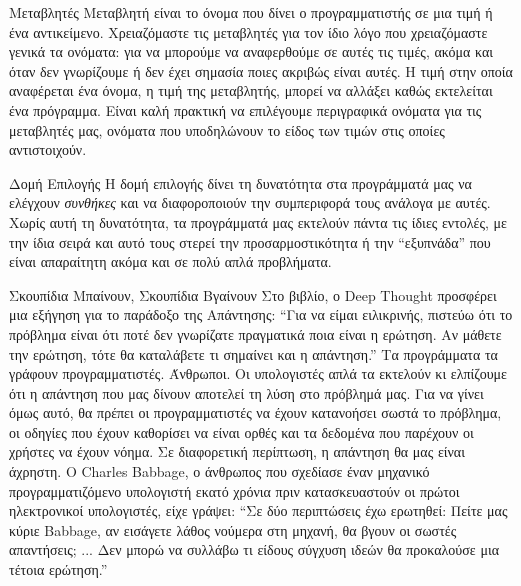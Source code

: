 \documentclass[a4paper,11pt,oneside]{book}
\begin{document}
\begin{theory}{Μεταβλητές}
Μεταβλητή είναι το όνομα που δίνει ο προγραμματιστής σε μια τιμή ή ένα αντικείμενο. Χρειαζόμαστε τις μεταβλητές για τον ίδιο λόγο που χρειαζόμαστε γενικά τα ονόματα: για να μπορούμε να αναφερθούμε σε αυτές τις τιμές, ακόμα και όταν δεν γνωρίζουμε ή δεν έχει σημασία ποιες ακριβώς είναι αυτές.
Η τιμή στην οποία αναφέρεται ένα όνομα, η τιμή της μεταβλητής, μπορεί να αλλάξει καθώς εκτελείται ένα πρόγραμμα. Είναι καλή πρακτική να επιλέγουμε περιγραφικά ονόματα για τις μεταβλητές μας, ονόματα που υποδηλώνουν το είδος των τιμών στις οποίες αντιστοιχούν. 
\end{theory}

\begin{theory}{Δομή Επιλογής}
Η δομή επιλογής δίνει τη δυνατότητα στα προγράμματά μας να ελέγχουν \emph{συνθήκες} και να διαφοροποιούν την συμπεριφορά τους ανάλογα με αυτές. Χωρίς αυτή τη δυνατότητα, τα προγράμματά μας εκτελούν πάντα τις ίδιες εντολές, με την ίδια σειρά και αυτό τους στερεί την προσαρμοστικότητα ή την ``εξυπνάδα'' που είναι απαραίτητη ακόμα και σε πολύ απλά προβλήματα.
\end{theory}

\begin{theory}{Σκουπίδια Μπαίνουν, Σκουπίδια Βγαίνουν}
Στο βιβλίο, ο Deep Thought προσφέρει μια εξήγηση για το παράδοξο της Απάντησης: ``Για να είμαι ειλικρινής, πιστεύω ότι το πρόβλημα είναι ότι ποτέ δεν γνωρίζατε πραγματικά ποια είναι η ερώτηση. Αν μάθετε την ερώτηση, τότε θα καταλάβετε τι σημαίνει και η απάντηση.'' Τα προγράμματα τα γράφουν προγραμματιστές. Άνθρωποι. Οι υπολογιστές απλά τα εκτελούν κι ελπίζουμε ότι η απάντηση που μας δίνουν αποτελεί τη λύση στο πρόβλημά μας. Για να γίνει όμως αυτό, θα πρέπει οι προγραμματιστές να έχουν κατανοήσει σωστά το πρόβλημα, οι οδηγίες που έχουν καθορίσει να είναι ορθές και τα δεδομένα που παρέχουν οι χρήστες να έχουν νόημα. Σε διαφορετική περίπτωση, η απάντηση θα μας είναι άχρηστη. Ο Charles Babbage, ο άνθρωπος που σχεδίασε έναν μηχανικό προγραμματιζόμενο υπολογιστή εκατό χρόνια πριν κατασκευαστούν οι πρώτοι ηλεκτρονικοί υπολογιστές, είχε γράψει: ``Σε δύο περιπτώσεις έχω ερωτηθεί: Πείτε μας κύριε Babbage, αν εισάγετε λάθος νούμερα στη μηχανή, θα βγουν οι σωστές απαντήσεις; ... Δεν μπορώ να συλλάβω τι είδους σύγχυση ιδεών θα προκαλούσε μια τέτοια ερώτηση.''
\end{theory}

\hrulefill
\end{document}
